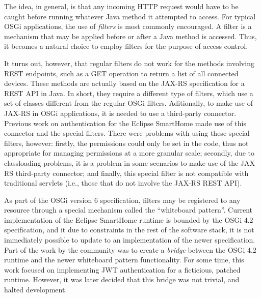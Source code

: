 \documentclass[12pt]{article}
\begin{document}
The idea, in general, is that any incoming HTTP request would have to be caught before running whatever Java method it attempted to access. For typical OSGi applications, the use of \emph{filters} is most commonly encouraged. A filter is a mechanism that may be applied before or after a Java method is accessed. Thus, it becomes a natural choice to employ filters for the purpose of access control.

It turns out, however, that regular filters do not work for the methods involving REST endpoints, such as a GET operation to return a list of all connected devices. These methods are actually based on the JAX-RS specification for a REST API in Java. In short, they require a different type of filters, which use a set of classes different from the regular OSGi filters. Aditionally, to make use of JAX-RS in OSGi applications, it is needed to use a third-party connector. Previous work on authentication for the Eclipse SmartHome made use of this connector and the special filters. There were problems with using these special filters, however: firstly, the permissions could only be set in the code, thus not appropriate for managing permissions at a more granular scale; secondly, due to classloading problems, it is a problem in some scenarios to make use of the JAX-RS third-party connector; and finally, this special filter is not compatible with traditional servlets (i.e., those that do not involve the JAX-RS REST API).

As part of the OSGi version 6 specification, filters may be registered to any resource through a special mechanism called the ``whiteboard pattern''. Current implementation of the Eclipse SmartHome runtime is bounded by the OSGi 4.2 specification, and it due to constraints in the rest of the software stack, it is not immediately possible to update to an implementation of the newer specification. Part of the work by the community was to create a \emph{bridge} between the OSGi 4.2 runtime and the newer whiteboard pattern functionality. For some time, this work focused on implementing JWT authentication for a ficticious, patched runtime. However, it was later decided that this bridge was not trivial, and halted development.
\end{document}
